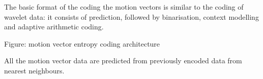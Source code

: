 The basic format of the coding the motion vectors is similar to the
coding of wavelet data: it consists of prediction, followed by
binarisation, context modelling and adaptive arithmetic coding.


Figure: motion vector entropy coding architecture

All the motion vector data are predicted from previously encoded data
from nearest neighbours.
